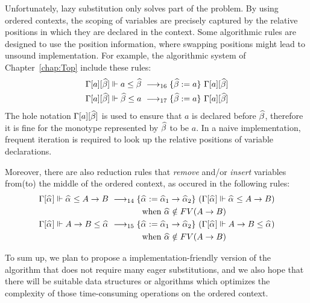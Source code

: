 Unfortunately, lazy substitution only solves part of the problem.
By using ordered contexts, the scoping of variables are precisely captured by
the relative positions in which they are declared in the context.
Some algorithmic rules are designed to use the position information,
where swapping positions might lead to unsound implementation.
For example, the algorithmic system of Chapter~\ref{chap:Top}
include these rules:
\begin{gather*}
\begin{aligned}
    \Gm[a][\bt] \Vdash a \le \bt &\rrule{16} \{\bt := a\}~\Gm[a][\bt]\\
    \Gm[a][\bt] \Vdash \bt \le a &\rrule{17} \{\bt := a\}~\Gm[a][\bt]\\
\end{aligned}
\end{gather*}
The hole notation $\Gm[a][\bt]$ is used to ensure that $a$ is declared before $\bt$,
therefore it is fine for the monotype represented by $\bt$ to be $a$.
In a naive implementation, frequent iteration is required to look up the
relative positions of variable declarations.

Moreover, there are also reduction rules that \emph{remove}
and/or \emph{insert} variables from(to) the middle of the ordered context,
as occured in the following rules:
\begin{gather*}
\begin{aligned}
\Gm[\al] \Vdash \al \le A\to B &\rrule{14}
    \{\al := \al[1] \to \al[2]\}~(\Gm[\al] \Vdash \al \le A\to B)\\
    &\qquad\qquad \text{when } \al\notin FV(A \to B)\\
\Gm[\al] \Vdash A\to B \le \al &\rrule{15}
    \{\al := \al[1] \to \al[2]\}~(\Gm[\al] \Vdash A\to B \le \al)\\
    &\qquad\qquad \text{when } \al\notin  FV(A \to B)\\
\end{aligned}
\end{gather*}

To sum up,
we plan to propose a implementation-friendly version of the algorithm
that does not require many eager substitutions,
and we also hope that there will be suitable data structures or algorithms
which optimizes the complexity of those time-consuming operations on the ordered context.


